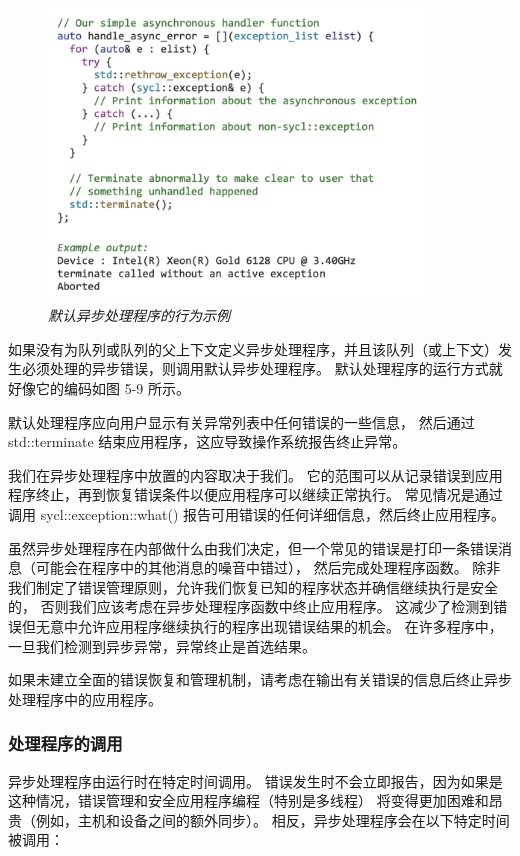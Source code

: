 \begin{figure}[H]
	\centering
	\includegraphics[width=0.9\textwidth]{figs/F5.9.png}
	\caption{\textit{默认异步处理程序的行为示例}}
\end{figure}

如果没有为队列或队列的父上下文定义异步处理程序，并且该队列（或上下文）发生必须处理的异步错误，则调用默认异步处理程序。 
默认处理程序的运行方式就好像它的编码如图 5-9 所示。

默认处理程序应向用户显示有关异常列表中任何错误的一些信息，
然后通过 std::terminate 结束应用程序，这应导致操作系统报告终止异常。

我们在异步处理程序中放置的内容取决于我们。 
它的范围可以从记录错误到应用程序终止，再到恢复错误条件以便应用程序可以继续正常执行。 
常见情况是通过调用 sycl::exception::what() 报告可用错误的任何详细信息，然后终止应用程序。

虽然异步处理程序在内部做什么由我们决定，但一个常见的错误是打印一条错误消息（可能会在程序中的其他消息的噪音中错过），
然后完成处理程序函数。 除非我们制定了错误管理原则，允许我们恢复已知的程序状态并确信继续执行是安全的，
否则我们应该考虑在异步处理程序函数中终止应用程序。 
这减少了检测到错误但无意中允许应用程序继续执行的程序出现错误结果的机会。 
在许多程序中，一旦我们检测到异步异常，异常终止是首选结果。

\begin{remark}
	如果未建立全面的错误恢复和管理机制，请考虑在输出有关错误的信息后终止异步处理程序中的应用程序。
\end{remark}

\subsubsection{处理程序的调用}
异步处理程序由运行时在特定时间调用。 
错误发生时不会立即报告，因为如果是这种情况，错误管理和安全应用程序编程（特别是多线程）
将变得更加困难和昂贵（例如，主机和设备之间的额外同步）。 相反，异步处理程序会在以下特定时间被调用：

